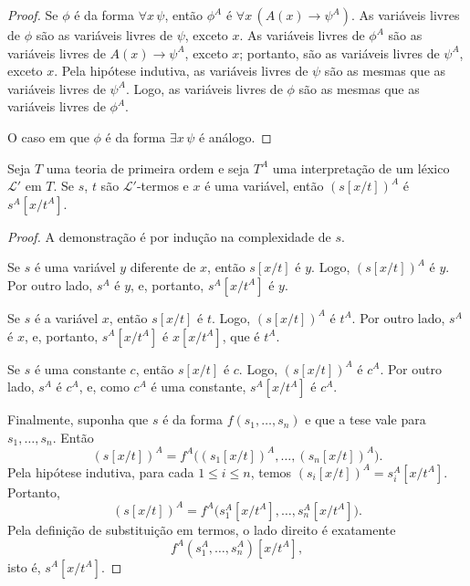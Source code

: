 \begin{proof}
    Se $\phi$ é da forma $\forall x\,\psi$, então $\phi^A$ é $\forall x\,(A(x)\to \psi^A)$.
    As variáveis livres de $\phi$ são as variáveis livres de $\psi$, exceto $x$.
    As variáveis livres de $\phi^A$ são as variáveis livres de $A(x)\to\psi^A$, exceto $x$; portanto, são as variáveis livres de $\psi^A$, exceto $x$.
    Pela hipótese indutiva, as variáveis livres de $\psi$ são as mesmas que as variáveis livres de $\psi^A$.
    Logo, as variáveis livres de $\phi$ são as mesmas que as variáveis livres de $\phi^A$.

    O caso em que $\phi$ é da forma $\exists x\,\psi$ é análogo.
\end{proof}

\begin{metalemma}
    Seja $T$ uma teoria de primeira ordem e seja $T^A$ uma interpretação de um léxico $\mathcal L'$ em $T$.
    Se $s$, $t$ são $\mathcal L'$-termos e $x$ é uma variável, então $(s[x/t])^A$ é $s^A[x/t^A]$.
\end{metalemma}
\begin{proof}
    A demonstração é por indução na complexidade de $s$.

    Se $s$ é uma variável $y$ diferente de $x$, então $s[x/t]$ é $y$.
    Logo, $(s[x/t])^A$ é $y$.
    Por outro lado, $s^A$ é $y$, e, portanto, $s^A[x/t^A]$ é $y$.

    Se $s$ é a variável $x$, então $s[x/t]$ é $t$.
    Logo, $(s[x/t])^A$ é $t^A$.
    Por outro lado, $s^A$ é $x$, e, portanto, $s^A[x/t^A]$ é $x[x/t^A]$, que é $t^A$.

    Se $s$ é uma constante $c$, então $s[x/t]$ é $c$.
    Logo, $(s[x/t])^A$ é $c^A$.
    Por outro lado, $s^A$ é $c^A$, e, como $c^A$ é uma constante, $s^A[x/t^A]$ é $c^A$.

    Finalmente, suponha que $s$ é da forma $f(s_1,\dots,s_n)$ e que a tese vale para $s_1,\dots,s_n$.
    Então
    \[
        (s[x/t])^A
        =
        f^A\bigl((s_1[x/t])^A,\dots,(s_n[x/t])^A\bigr).
    \]
    Pela hipótese indutiva, para cada $1\leq i\leq n$, temos $(s_i[x/t])^A=s_i^A[x/t^A]$.
    Portanto,
    \[
        (s[x/t])^A
        =
        f^A\bigl(s_1^A[x/t^A],\dots,s_n^A[x/t^A]\bigr).
    \]
    Pela definição de substituição em termos, o lado direito é exatamente
    \[
        f^A(s_1^A,\dots,s_n^A)[x/t^A],
    \]
    isto é, $s^A[x/t^A]$.
\end{proof}


